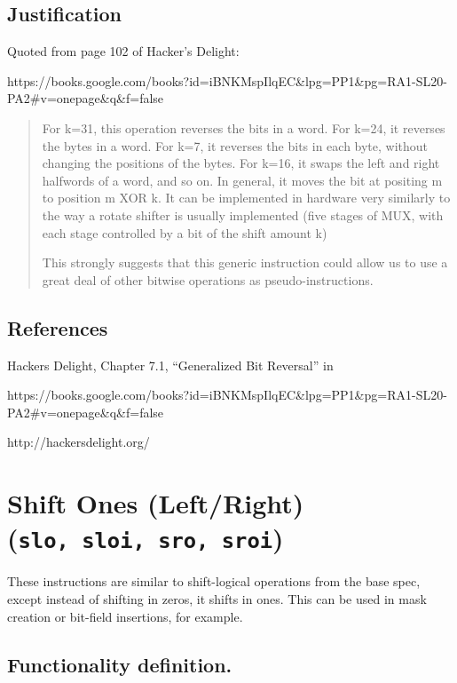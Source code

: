 \subsection{Justification}\label{justification-1}

Quoted from page 102 of Hacker's Delight:

https://books.google.com/books?id=iBNKMspIlqEC\&lpg=PP1\&pg=RA1-SL20-PA2\#v=onepage\&q\&f=false

\begin{quote}
For k=31, this operation reverses the bits in a word. For k=24, it
reverses the bytes in a word. For k=7, it reverses the bits in each
byte, without changing the positions of the bytes. For k=16, it swaps
the left and right halfwords of a word, and so on. In general, it moves
the bit at positing m to position m XOR k. It can be implemented in
hardware very similarly to the way a rotate shifter is usually
implemented (five stages of MUX, with each stage controlled by a bit of
the shift amount k)

This strongly suggests that this generic instruction could allow us to
use a great deal of other bitwise operations as pseudo-instructions.
\end{quote}

\subsection{References}\label{references-2}

Hackers Delight, Chapter 7.1, ``Generalized Bit Reversal'' in

https://books.google.com/books?id=iBNKMspIlqEC\&lpg=PP1\&pg=RA1-SL20-PA2\#v=onepage\&q\&f=false

http://hackersdelight.org/

\section{\texorpdfstring{Shift Ones (Left/Right)
(\texttt{slo,\ sloi,\ sro,\ sroi})}{Shift Ones (Left/Right) (slo, sloi, sro, sroi)}}\label{shift-ones-leftright-slo-sloi-sro-sroi}

These instructions are similar to shift-logical operations from the base
spec, except instead of shifting in zeros, it shifts in ones. This can
be used in mask creation or bit-field insertions, for example.

\subsection{Functionality
definition.}\label{functionality-definition.-2}

